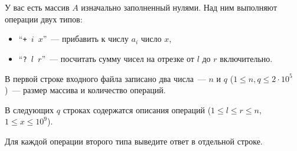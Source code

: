 
\Legend
У вас есть массив $A$ изначально заполненный нулями. Над ним выполняют операции двух типов:

\begin{itemize}
	\item ``\texttt{+ $i$ $x$}''~--- прибавить к числу $a_i$ число $x$,
	\item ``\texttt{? $l$ $r$}''~--- посчитать сумму чисел на отрезке от $l$ до $r$ включительно.
\end{itemize}

\Input
В первой строке входного файла записано два числа~--- $n$ и $q$ ($1 \le n, q \le 2 \cdot 10^5$)~---
размер массива и количество операций.

В следующих $q$ строках содержатся описания операций ($1 \le l \le r \le n$, $1 \le x \le 10^9$).

\Output
Для каждой операции второго типа выведите ответ в отдельной строке.

\Samples
\BeginTests
{}
\EndTests

\EndProblem
